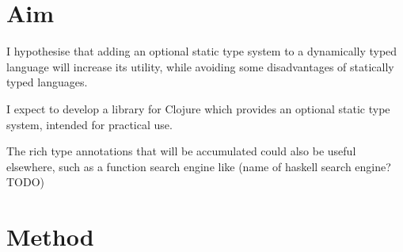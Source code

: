 \documentclass[12pt, a4paper]{article}
\begin{document}
\section*{Aim} 


I hypothesise that adding an optional static type system to a dynamically typed language
will increase its utility, while avoiding some disadvantages of statically typed
languages.

I expect to develop a library for Clojure which provides an optional static
type system, intended for practical use. 

The rich type annotations that will be accumulated could also be
useful elsewhere, such as a function search engine like
(name of haskell search engine? TODO)

\section*{Method}

\end{document}
